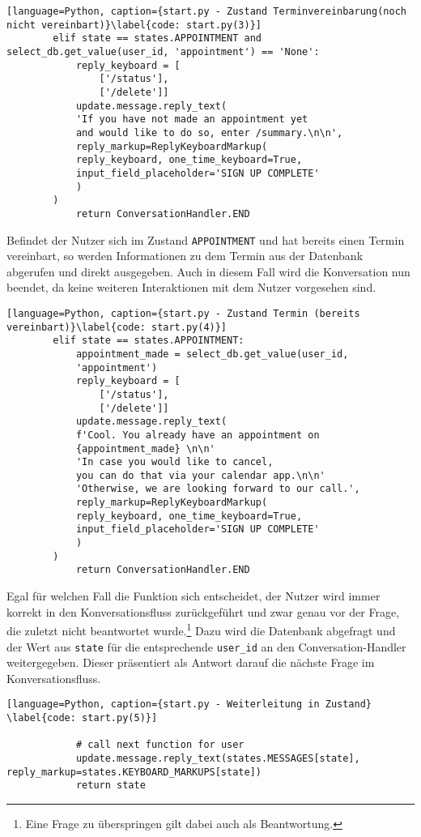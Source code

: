             \begin{lstlisting}[language=Python, caption={start.py - Zustand Terminvereinbarung(noch nicht vereinbart)}\label{code: start.py(3)}]
        elif state == states.APPOINTMENT and select_db.get_value(user_id, 'appointment') == 'None':
            reply_keyboard = [
                ['/status'], 
                ['/delete']]
            update.message.reply_text(
            'If you have not made an appointment yet 
            and would like to do so, enter /summary.\n\n',
            reply_markup=ReplyKeyboardMarkup(
            reply_keyboard, one_time_keyboard=True, 
            input_field_placeholder='SIGN UP COMPLETE'
            )
        )
            return ConversationHandler.END
            \end{lstlisting}

            Befindet der Nutzer sich im Zustand \verb|APPOINTMENT| und hat bereits einen Termin vereinbart, so werden Informationen zu dem Termin aus der Datenbank abgerufen und direkt ausgegeben. Auch in diesem Fall wird die Konversation nun beendet, da keine weiteren Interaktionen mit dem Nutzer vorgesehen sind.
            \begin{lstlisting}[language=Python, caption={start.py - Zustand Termin (bereits vereinbart)}\label{code: start.py(4)}]
        elif state == states.APPOINTMENT:
            appointment_made = select_db.get_value(user_id, 
            'appointment')
            reply_keyboard = [
                ['/status'], 
                ['/delete']]
            update.message.reply_text(
            f'Cool. You already have an appointment on 
            {appointment_made} \n\n'
            'In case you would like to cancel, 
            you can do that via your calendar app.\n\n'
            'Otherwise, we are looking forward to our call.',
            reply_markup=ReplyKeyboardMarkup(
            reply_keyboard, one_time_keyboard=True, 
            input_field_placeholder='SIGN UP COMPLETE'
            )
        )
            return ConversationHandler.END
            \end{lstlisting}
            Egal für welchen Fall die Funktion sich entscheidet, der Nutzer wird immer korrekt in den Konversationsfluss zurückgeführt und zwar genau vor der Frage, die zuletzt nicht beantwortet wurde.\footnote{Eine Frage zu überspringen gilt dabei auch als Beantwortung.} Dazu wird die Datenbank abgefragt und der Wert aus \verb|state| für die entsprechende \verb|user_id| an den Conversation-Handler weitergegeben. Dieser präsentiert als Antwort darauf die nächste Frage im Konversationsfluss. \\
            \begin{lstlisting}[language=Python, caption={start.py - Weiterleitung in Zustand} \label{code: start.py(5)}]

            # call next function for user
            update.message.reply_text(states.MESSAGES[state], reply_markup=states.KEYBOARD_MARKUPS[state])
            return state
            \end{lstlisting}

